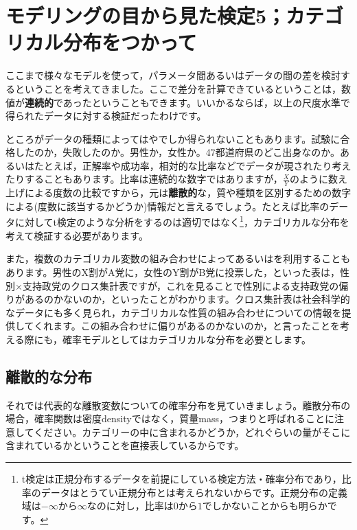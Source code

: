 \documentclass{ltjsbook}
\begin{document}
 
\VerbatimFootnotes
\chapter{モデリングの目から見た検定5；カテゴリカル分布をつかって}
\label{chapter23} 
ここまで様々なモデルを使って，パラメータ間あるいはデータの間の差を検討するということを考えてきました。ここで差分を計算できているということは，数値が\textbf{連続的}であったということもできます。いいかるならば，以上の尺度水準で得られたデータに対する検証だったわけです。

ところがデータの種類によってはやでしか得られないこともあります。試験に合格したのか，失敗したのか。男性か，女性か。47都道府県のどこ出身なのか。あるいはたとえば，正解率や成功率，相対的な比率などでデータが現されたり考えたりすることもあります。比率は連続的な数字ではありますが，$\frac{X}{Y}$のように数え上げによる度数の比較ですから，元は\textbf{離散的}な，質や種類を区別するための数字による(度数に該当するかどうか)情報だと言えるでしょう。たとえば比率のデータに対してt検定のような分析をするのは適切ではなく\footnote{t検定は正規分布するデータを前提にしている検定方法・確率分布であり，比率のデータはとうてい正規分布とは考えられないからです。正規分布の定義域は$-\infty$から$\infty$なのに対し，比率は$0$から$1$でしかないことからも明らかです。}，カテゴリカルな分布を考えて検証する必要があります。

また，複数のカテゴリカル変数の組み合わせによってあるいはを利用することもあります。男性のX割がA党に，女性のY割がB党に投票した，といった表は，性別$\times$支持政党のクロス集計表ですが，これを見ることで性別による支持政党の偏りがあるのかないのか，といったことがわかります。クロス集計表は社会科学的なデータにも多く見られ，カテゴリカルな性質の組み合わせについての情報を提供してくれます。この組み合わせに偏りがあるのかないのか，と言ったことを考える際にも，確率モデルとしてはカテゴリカルな分布を必要とします。

\section{離散的な分布}
\label{DiscreteDistibutions}
それでは代表的な離散変数についての確率分布を見ていきましょう。離散分布の場合，確率関数は密度densityではなく，質量mass，つまりと呼ばれることに注意してください。カテゴリーの中に含まれるかどうか，どれぐらいの量がそこに含まれているかということを直接表しているからです。
\end{document}
